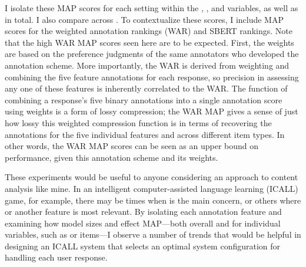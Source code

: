 I isolate these MAP scores for each setting within the , , and  variables, as well as in total. I also compare across . To contextualize these scores, I include MAP scores for the weighted annotation rankings (WAR) and SBERT rankings. Note that the high WAR MAP scores seen here are to be expected. First, the weights are based on the preference judgments of the same annotators who developed the annotation scheme. More importantly, the WAR is derived from weighting and combining the five feature annotations for each response, so precision in assessing any one of these features is inherently correlated to the WAR. 
The function of combining a response's five binary annotations into a single annotation score using weights is a form of lossy compression; the WAR MAP gives a sense of just how lossy this weighted compression function is in terms of recovering the annotations for the five individual features and across different item types. In other words, the WAR MAP scores can be seen as an upper bound on performance, given this annotation scheme and its weights. 

These experiments would be useful to anyone considering an approach to content analysis like mine. In an intelligent computer-assisted language learning (ICALL) game, for example, there may be times when  is the main concern, or others where  or another feature is most relevant. By isolating each annotation feature and examining how model sizes and  effect MAP---both overall and for individual variables, such as  or  items---I observe a number of trends that would be helpful in designing an ICALL system that selects an optimal system configuration for handling each user response.

